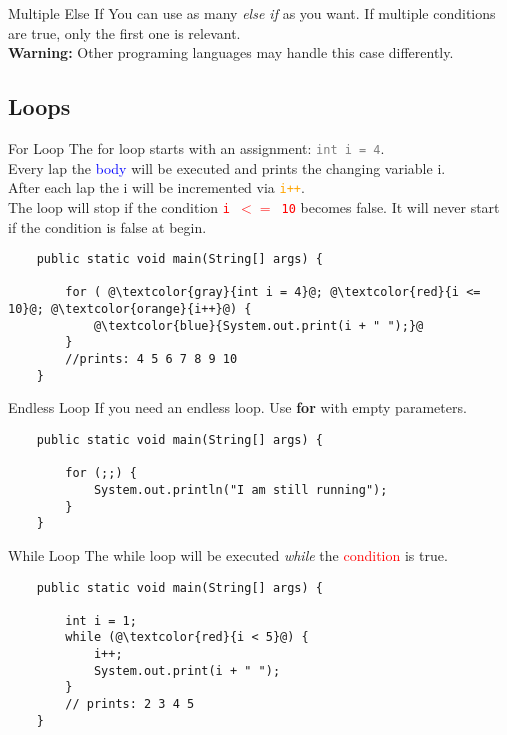 \begin{frame}{Multiple Else If}
	You can use as many \emph{else if} as you want.
	If multiple conditions are true, only the first one is relevant. \\
	\vfill
	\textbf{Warning: } Other programing languages may handle this case differently.
\end{frame}

\subsection{Loops}
\begin{frame}[fragile]{For Loop}
	The for loop starts with an assignment: \textcolor{gray}{\texttt{int i = 4}}. \\
	Every lap the \textcolor{blue}{body} will be executed and prints the changing variable i. \\
	After each lap the i will be incremented via \textcolor{orange}{\texttt{i++}}. \\
	The loop will stop if the condition \textcolor{red}{\texttt{i $<=$ 10}} becomes false. 
	It will never start if the condition is false at begin.
	\begin{lstlisting}
	public static void main(String[] args) {
	
	    for ( @\textcolor{gray}{int i = 4}@; @\textcolor{red}{i <= 10}@; @\textcolor{orange}{i++}@) {
	        @\textcolor{blue}{System.out.print(i + " ");}@   
	    }
	    //prints: 4 5 6 7 8 9 10
	}
	\end{lstlisting}
\end{frame}

\begin{frame}[fragile]{Endless Loop}
	If you need an endless loop. Use \textbf{for} with empty parameters.
	\begin{lstlisting}
	public static void main(String[] args) {
	
	    for (;;) {
	        System.out.println("I am still running");
	    }
	}
	\end{lstlisting}
\end{frame}

\begin{frame}[fragile]{While Loop}
	The while loop will be executed \emph{while} the \textcolor{red}{condition} is true.
	\begin{lstlisting}
	public static void main(String[] args) {
	
	    int i = 1;
	    while (@\textcolor{red}{i < 5}@) {
	        i++;
	        System.out.print(i + " ");
	    }
	    // prints: 2 3 4 5
	}
	\end{lstlisting}
\end{frame}

